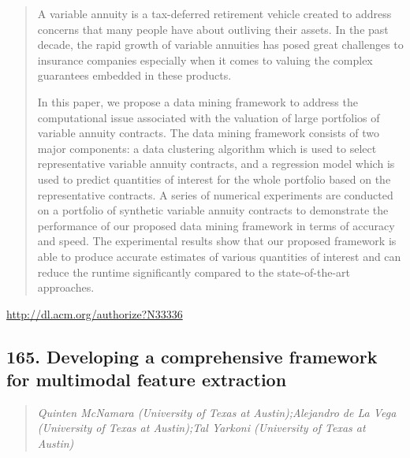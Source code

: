\documentclass{article}
\begin{document}
\begin{quote}
A variable annuity is a tax-deferred retirement vehicle created to address concerns that many people have about outliving their assets. In the past decade, the rapid growth of variable annuities has posed great challenges to insurance companies especially when it comes to valuing the complex guarantees embedded in these products. 







  In this paper, we propose a data mining framework to address the computational issue associated with the valuation of large portfolios of variable annuity contracts. The data mining framework consists of two major components: a data clustering algorithm which is used to select representative variable annuity contracts, and a regression model which is used to predict quantities of interest for the whole portfolio based on the representative contracts. A series of numerical experiments are conducted on a portfolio of synthetic variable annuity contracts to demonstrate the performance of our proposed data mining framework in terms of accuracy and speed. The experimental results show that our proposed framework is able to produce accurate estimates of various quantities of interest and can reduce the runtime significantly compared to the state-of-the-art approaches.
\end{quote}

\href{http://dl.acm.org/authorize?N33336}{http://dl.acm.org/authorize?N33336}

\subsection{165. Developing a comprehensive framework for multimodal feature extraction}

\begin{quote}
\footnotesize{\textit{Quinten McNamara (University of Texas at Austin);Alejandro de La Vega (University of Texas at Austin);Tal Yarkoni (University of Texas at Austin)}}

\end{quote}
\end{document}
